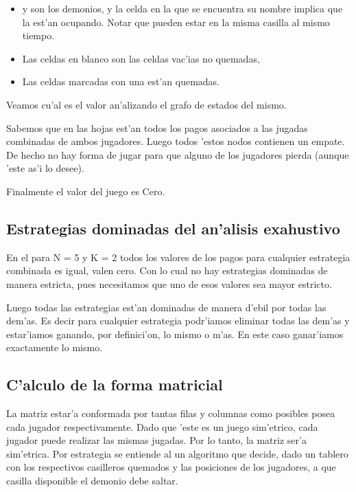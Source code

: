 \begin{itemize}
\item {} y  son los demonios, y la celda en la que se encuentra su nombre implica que la est'an ocupando. Notar que pueden estar en la misma casilla al mismo tiempo.
\item Las celdas en blanco son las celdas vac'ias no quemadas,
\item Las celdas marcadas con una  est'an quemadas.
\end{itemize}


Veamos cu'al es el valor an'alizando el grafo de estados del mismo.

Sabemos que en las hojas est'an todos los pagos asociados a las jugadas combinadas de ambos jugadores. Luego todos 'estos nodos contienen un empate. De hecho no hay forma de jugar para que alguno de los jugadores pierda (aunque 'este as'i lo desee).

Finalmente el valor del juego es Cero.



\subsection{Estrategias dominadas del an'alisis exahustivo}
En el  para N = 5 y K = 2 todos los valores de los pagos para cualquier estrategia combinada es igual, valen cero. Con lo cual no hay estrategias dominadas de manera estricta, pues necesitamos que uno de esos valores sea mayor estricto.

Luego todas las estrategias est'an dominadas de manera d'ebil por todas las dem'as. Es decir para cualquier estrategia podr'iamos eliminar todas las dem'as y estar'iamos ganando, por definici'on, lo mismo o m'as. En este caso ganar'iamos exactamente lo mismo.



\subsection{C'alculo de la forma matricial}
La matriz estar'a conformada por tantas filas y columnas como  posibles posea cada jugador respectivamente. Dado que 'este es un juego sim'etrico, cada jugador puede realizar las mismas jugadas. Por lo tanto, la matriz ser'a sim'etrica. Por estrategia se entiende al un algoritmo que decide, dado un tablero con los respectivos casilleros quemados y las posiciones de los jugadores, a que casilla disponible el demonio debe saltar.

